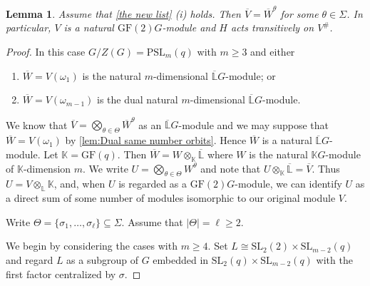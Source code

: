 \documentclass[12pt]{amsart}
\newtheorem{lemma}[theorem]{Lemma}
\theoremstyle{remark}
\theoremstyle{notation}
\theoremstyle{definition}
\newcommand{\GF}{\mathrm{GF}}
\newcommand{\SL}{\mathrm{SL}}
\newcommand{\0}{\emptyset}
\newcommand{\PSL}{\mathrm{PSL}}
\begin{document}
\begin{lemma}\label{lem:more factors impossible}
Assume that \cref{the new list} (i) holds. Then    $\overline V= \overline W^{\theta}$ for some $\theta\in \Sigma$.  In particular,  $V$ is a natural $\GF(2)G$-module and $H$ acts transitively on $V^\#$.
\end{lemma}
\begin{proof}  In this case $G/Z(G)=\PSL_m(q)$ with $m \ge 3$  and either\begin{enumerate} \item $\overline{W}=V(\omega_1)$ is the natural $m$-dimensional $\overline{\mathbb L}G$-module; or\item $\overline{W}=V(\omega_{m-1})$ is the dual natural $m$-dimensional $\overline{\mathbb L}G$-module.\end{enumerate}

 We know that $\overline{V}= \bigotimes_{\theta \in \Theta} \overline W^{\theta}$ as an $\overline {\mathbb {L}} G$-module and we may  suppose that $\overline W= V(\omega_1)$ by  \cref{lem:Dual same number orbits}. Hence $\overline W$ is a natural $\overline {\mathbb L} G$-module. Let  $\mathbb K=\GF(q)$. Then
 $\overline{W} = W\otimes_{\mathbb K} \overline{\mathbb L}$ where $W$ is the natural $\mathbb K G$-module of $\mathbb K$-dimension $m$.  We write   $U= \bigotimes_{\theta \in \Theta} W^{\theta}$  and note that $U\otimes _{\mathbb K} \overline{\mathbb L} = \overline V$. Thus $U= V \otimes_{\mathbb L}\mathbb K$,
and, when $U$ is regarded as a $\GF(2)G$-module, we can identify $U$ as a direct sum of some number of modules isomorphic to our original module $V$.



Write $\Theta=\{\sigma_1, \dots, \sigma_\ell\} \subseteq \Sigma$.  Assume that $|\Theta|=\ell\ge 2$.

We begin by considering the cases with $m \ge 4$.  Set $L \cong \SL_2(2)\times \SL_{m-2}(q)$ and regard $L$ as a subgroup of $G$ embedded in $\SL_2(q)\times \SL_{m-2}(q)$ with the first factor centralized by $\sigma$.




\end{proof}
\end{document}
